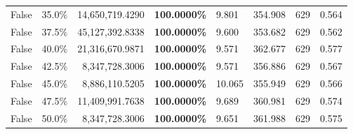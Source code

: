 \begin{table}[H]
\begin{tabular}{|m{} | m{} | r | R{0.13\textwidth} | R{0.09\textwidth} | R{0.09\textwidth} | R{0.09\textwidth} | R{0.11\textwidth} |}
False & 35.0\% & 14,650,719.4290 & \bfseries \color{red} 100.0000\% & 9.801 & 354.908 & 629 & 0.564 \\
False & 37.5\% & 45,127,392.8338 & \bfseries \color{red} 100.0000\% & 9.600 & 353.682 & 629 & 0.562 \\
False & 40.0\% & 21,316,670.9871 & \bfseries \color{red} 100.0000\% & 9.571 & 362.677 & 629 & 0.577 \\
False & 42.5\% & 8,347,728.3006 & \bfseries \color{red} 100.0000\% & 9.571 & 356.886 & 629 & 0.567 \\
False & 45.0\% & 8,886,110.5205 & \bfseries \color{red} 100.0000\% & 10.065 & 355.949 & 629 & 0.566 \\
False & 47.5\% & 11,409,991.7638 & \bfseries \color{red} 100.0000\% & 9.689 & 360.981 & 629 & 0.574 \\
False & 50.0\% & 8,347,728.3006 & \bfseries \color{red} 100.0000\% & 9.651 & 361.988 & 629 & 0.575 \\
\bottomrule
\end{tabular}
\end{table}
